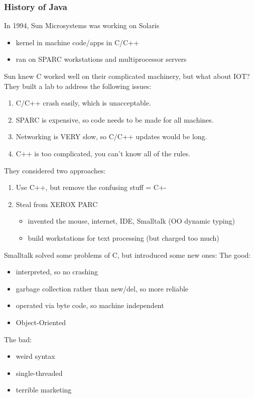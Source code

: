 \documentclass[../../lecture_notes.tex]{subfiles}
\begin{document}
\subsubsection*{History of Java}
In 1994, Sun Microsystems was working on Solaris
\begin{itemize} [itemsep=0mm]
	\item kernel in machine code/apps in C/C++
	\item ran on SPARC workstations and multiprocessor servers
\end{itemize}
\noindent Sun knew C worked well on their complicated machinery, but what about IOT?
They built a lab to address the following issues:
\begin{enumerate} [itemsep=0mm]
	\item C/C++ crash easily, which is unacceptable.
	\item SPARC is expensive, so code needs to be made for all machines.
	\item Networking is VERY slow, so C/C++ updates would be long.
	\item C++ is too complicated, you can’t know all of the rules.
\end{enumerate}
 They considered two approaches:
 \begin{enumerate} [itemsep=0mm]
 	\item Use C++, but remove the confusing stuff = C+-
 	\item Steal from XEROX PARC
		\begin{itemize} [itemsep=0mm]
			\item invented the mouse, internet, IDE, Smalltalk (OO dynamic typing)
			\item build workstations for text processing (but charged too much)
		\end{itemize}
\end{enumerate}
\noindent Smalltalk solved some problems of C, but introduced some new ones:
\indent The good:
\begin{itemize} [itemsep=0mm]
	\item interpreted, so no crashing
	\item garbage collection rather than new/del, so more reliable
	\item operated via byte code, so machine independent
	\item Object-Oriented
\end{itemize}
The bad:
\begin{itemize} [itemsep=0mm]
	\item weird syntax
	\item single-threaded
	\item terrible marketing
\end{itemize}
\end{document}
